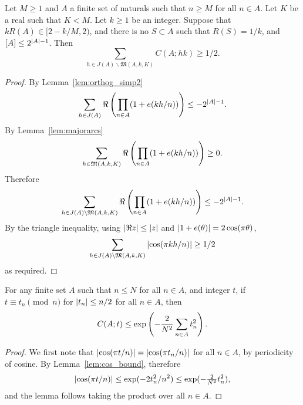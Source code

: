 \begin{lemma}\label{lem:minor_lbound}
  \leanok
Let $M\geq 1$ and $A$ a finite set of naturals such that $n\geq M$ for all $n\in A$. Let $K$ be a real such that $K<M$. Let $k\geq 1$ be an integer. Suppose that $kR(A) \in [2-k/M,2)$, and there is no $S\subset A$ such that $R(S)=1/k$, and $[A]\leq 2^{\left\lvert A\right\rvert-1}$. Then
\[\sum_{h\in J(A)\backslash \mathfrak{M}(A,k,K)} C(A;hk)\geq 1/2.\]
\end{lemma}
\begin{proof}
  \leanok
{}
By Lemma~\ref{lem:orthog_simp2}
\[\sum_{h\in J(A)}\Re\left( \prod_{n\in A}(1+e(kh/n))\right)\leq -2^{\left\lvert A\right\rvert-1}.\]
By Lemma~\ref{lem:majorarcs}
\[\sum_{h\in \mathfrak{M}(A,k,K)}\Re\left( \prod_{n\in A}(1+e(kh/n))\right) \geq 0.\]
Therefore
\[\sum_{h\in J(A)\backslash \mathfrak{M}(A,k,K)}\Re\left( \prod_{n\in A}(1+e(kh/n))\right)\leq -2^{\left\lvert A\right\rvert-1}.\]
By the triangle inequality, using $\left\lvert \Re z\right\rvert\leq \left\lvert z\right\rvert$ and $\left\lvert 1+e(\theta)\right\rvert=2\cos(\pi \theta)$,
\[\sum_{h\in J(A)\backslash \mathfrak{M}(A,k,K)}\left\lvert \cos(\pi kh/n)\right\rvert \geq 1/2\]
as required.
\end{proof}

\begin{lemma}\label{lem:cos_prod_bound}
  \leanok
For any finite set $A$ such that $n\leq N$ for all $n\in A$, and integer $t$, if $t\equiv t_n\pmod{n}$ for $\left\lvert t_n\right\rvert\leq n/2$ for all $n\in A$, then
\[C(A;t)\leq \exp\left( -\frac{2}{N^2}\sum_{n\in A}t_n^2\right).\]
\end{lemma}
\begin{proof}
  \leanok
{}
We first note that $\left\lvert \cos(\pi t/n)\right\rvert=\left\lvert \cos(\pi t_n/n)\right\rvert$ for all $n\in A$, by periodicity of cosine. By Lemma~\ref{lem:cos_bound}, therefore
\[\left\lvert \cos(\pi t/n)\right\rvert\leq \exp(-2t_n^2/n^2)\leq \exp(-\tfrac{2}{N^2}t_n^2),\]
and the lemma follows taking the product over all $n\in A$.
\end{proof}


